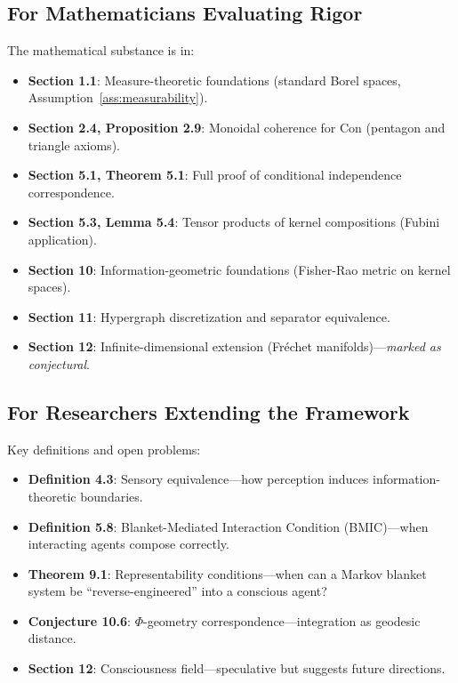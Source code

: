 \documentclass[11pt,a4paper]{article}
\theoremstyle{definition}
\theoremstyle{plain}
\theoremstyle{remark}
\begin{document}
\subsection*{For Mathematicians Evaluating Rigor}

The mathematical substance is in:
\begin{itemize}
    \item \textbf{Section 1.1}: Measure-theoretic foundations (standard Borel spaces, Assumption~\ref{ass:measurability}).
    \item \textbf{Section 2.4, Proposition 2.9}: Monoidal coherence for Con (pentagon and triangle axioms).
    \item \textbf{Section 5.1, Theorem 5.1}: Full proof of conditional independence correspondence.
    \item \textbf{Section 5.3, Lemma 5.4}: Tensor products of kernel compositions (Fubini application).
    \item \textbf{Section 10}: Information-geometric foundations (Fisher-Rao metric on kernel spaces).
    \item \textbf{Section 11}: Hypergraph discretization and separator equivalence.
    \item \textbf{Section 12}: Infinite-dimensional extension (Fr\'echet manifolds)---\emph{marked as conjectural}.
\end{itemize}

\subsection*{For Researchers Extending the Framework}

Key definitions and open problems:
\begin{itemize}
    \item \textbf{Definition 4.3}: Sensory equivalence---how perception induces information-theoretic boundaries.
    \item \textbf{Definition 5.8}: Blanket-Mediated Interaction Condition (BMIC)---when interacting agents compose correctly.
    \item \textbf{Theorem 9.1}: Representability conditions---when can a Markov blanket system be ``reverse-engineered'' into a conscious agent?
    \item \textbf{Conjecture 10.6}: $\Phi$-geometry correspondence---integration as geodesic distance.
    \item \textbf{Section 12}: Consciousness field---speculative but suggests future directions.
\end{itemize}
\end{document}
